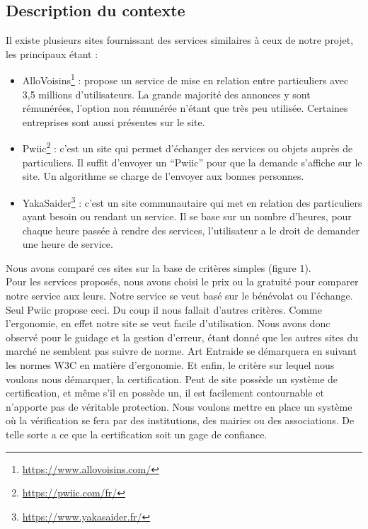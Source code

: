 \documentclass[a4paper,11pt]{article}
\begin{document}
\subsection{Description du contexte}

Il existe plusieurs sites fournissant des services similaires à ceux de notre projet, les principaux étant :\\

\begin{itemize}
  \item AlloVoisins\footnote{\url{https://www.allovoisins.com/}} : propose un service de mise en relation entre particuliers avec 3,5 millions
  d'utilisateurs. La grande majorité des annonces y sont rémunérées, l’option non rémunérée
  n’étant que très peu utilisée. Certaines entreprises sont aussi présentes sur le site.

  \item Pwiic\footnote{\url{https://pwiic.com/fr/}} : c’est un site qui permet d’échanger des services ou objets auprès de particuliers. Il suffit
  d’envoyer un “Pwiic” pour que la demande s’affiche sur le site. Un algorithme se charge de
  l’envoyer aux bonnes personnes.

  \item YakaSaider\footnote{\url{https://www.yakasaider.fr/}} : c’est un site communautaire qui met en relation des particuliers ayant besoin ou
  rendant un service. Il se base sur un nombre d’heures, pour chaque heure passée à rendre des
  services, l’utilisateur a le droit de demander une heure de service.
\end{itemize}

Nous avons comparé ces sites sur la base de critères simples (figure 1).\\
Pour les services proposés, nous avons choisi le prix ou la gratuité pour comparer notre service aux leurs.
Notre service se veut basé sur le bénévolat ou l'échange. Seul Pwiic propose ceci.
Du coup il nous fallait d'autres critères. Comme l'ergonomie, en effet notre site se veut facile d'utilisation.
Nous avons donc observé pour le guidage et la gestion d'erreur, étant donné que les autres sites du marché ne semblent pas suivre de norme.
Art Entraide se démarquera en suivant les normes W3C en matière d'ergonomie.
Et enfin, le critère sur lequel nous voulons nous démarquer, la certification.
Peut de site possède un système de certification, et même s'il en possède un, il est facilement contournable et n'apporte pas de véritable protection.
Nous voulons mettre en place un système où la vérification se fera par des institutions, des mairies ou des associations.
De telle sorte a ce que la certification soit un gage de confiance.\\
\end{document}

